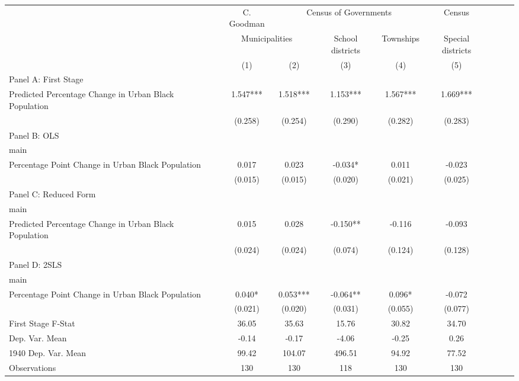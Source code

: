  \begin{tabular}{l*{8}{c}} \toprule
&\multicolumn{1}{c}{C. Goodman}&\multicolumn{3}{c}{Census of Governments}&\multicolumn{1}{c}{Census}\\\cmidrule(lr){2-2}\cmidrule(lr){3-5}\cmidrule(lr){6-6}
&\multicolumn{2}{c}{Municipalities}&\multicolumn{1}{c}{School districts}&\multicolumn{1}{c}{Townships}&\multicolumn{1}{c}{Special districts}&\\\cmidrule(lr){2-3}\cmidrule(lr){4-5}\cmidrule(lr){6-6}
&\multicolumn{1}{c}{(1)}&\multicolumn{1}{c}{(2)}&\multicolumn{1}{c}{(3)}&\multicolumn{1}{c}{(4)}&\multicolumn{1}{c}{(5)}\\
\cmidrule(lr){1-6}
\multicolumn{5}{l}{Panel A: First Stage}\\
\cmidrule(lr){1-6}
Predicted Percentage Change in Urban Black Population&    1.547***&    1.518***&    1.153***&    1.567***&    1.669***\\
                &  (0.258)   &  (0.254)   &  (0.290)   &  (0.282)   &  (0.283)   \\
\cmidrule(lr){1-6}
\multicolumn{5}{l}{Panel B: OLS}\\
\cmidrule(lr){1-6}
main            &            &            &            &            &            \\
Percentage Point Change in Urban Black Population&    0.017   &    0.023   &   -0.034*  &    0.011   &   -0.023   \\
                &  (0.015)   &  (0.015)   &  (0.020)   &  (0.021)   &  (0.025)   \\
\cmidrule(lr){1-6}
\multicolumn{5}{l}{Panel C: Reduced Form}\\
\cmidrule(lr){1-6}
main            &            &            &            &            &            \\
Predicted Percentage Change in Urban Black Population&    0.015   &    0.028   &   -0.150** &   -0.116   &   -0.093   \\
                &  (0.024)   &  (0.024)   &  (0.074)   &  (0.124)   &  (0.128)   \\
\cmidrule(lr){1-6}
\multicolumn{5}{l}{Panel D: 2SLS}\\
\cmidrule(lr){1-6}
main            &            &            &            &            &            \\
Percentage Point Change in Urban Black Population&    0.040*  &    0.053***&   -0.064** &    0.096*  &   -0.072   \\
                &  (0.021)   &  (0.020)   &  (0.031)   &  (0.055)   &  (0.077)   \\
\midrule
First Stage F-Stat&    36.05   &    35.63   &    15.76   &    30.82   &    34.70   \\
Dep. Var. Mean  &    -0.14   &    -0.17   &    -4.06   &    -0.25   &     0.26   \\
1940 Dep. Var. Mean&    99.42   &   104.07   &   496.51   &    94.92   &    77.52   \\
Observations    &      130   &      130   &      118   &      130   &      130   \\
 \bottomrule \end{tabular}
